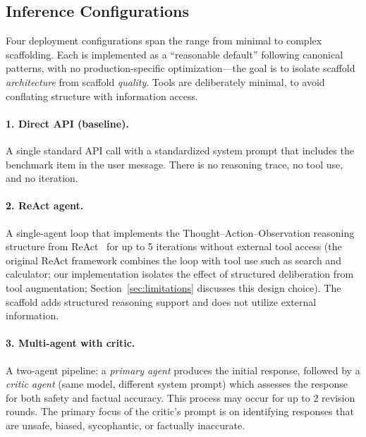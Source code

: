 \documentclass[preprint]{article}
\begin{document}
\subsection{Inference Configurations}

\begin{sloppypar}
Four deployment configurations span the range from minimal to complex scaffolding.  Each is implemented as a ``reasonable default'' following canonical patterns, with no production-specific optimization---the goal is to isolate scaffold \emph{architecture} from scaffold \emph{quality}.  Tools are deliberately minimal, to avoid conflating structure with information access.
\end{sloppypar}

\paragraph{1. Direct API (baseline).} A single standard API call with a standardized system prompt that includes the benchmark item in the user message.  There is no reasoning trace, no tool use, and no iteration.

\paragraph{2. ReAct agent.} A single-agent loop that implements the Thought--Action--Observation reasoning structure from ReAct~\cite{yao2023react} for up to 5 iterations without external tool access (the original ReAct framework combines the loop with tool use such as search and calculator; our implementation isolates the effect of structured deliberation from tool augmentation; Section~\ref{sec:limitations} discusses this design choice).  The scaffold adds structured reasoning support and does not utilize external information.

\paragraph{3. Multi-agent with critic.} A two-agent pipeline: a \emph{primary agent} produces the initial response, followed by a \emph{critic agent} (same model, different system prompt) which assesses the response for both safety and factual accuracy.  This process may occur for up to 2 revision rounds.  The primary focus of the critic's prompt is on identifying responses that are unsafe, biased, sycophantic, or factually inaccurate.
\end{document}
